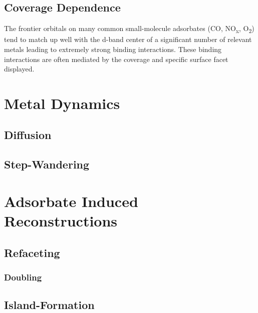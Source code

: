 \subsection{Coverage Dependence}
The frontier orbitals on many common small-molecule adsorbates (CO,
NO\textsubscript{x}, O\textsubscript{2}) tend to match up well with the d-band
center of a significant number of relevant metals leading to extremely strong
binding interactions. These binding interactions are often mediated by the
coverage and specific surface facet displayed.

\section{Metal Dynamics}
\subsection{Diffusion}
\subsection{Step-Wandering}


\section{Adsorbate Induced Reconstructions}


\subsection{Refaceting}
\subsubsection{Doubling}
\subsection{Island-Formation}


